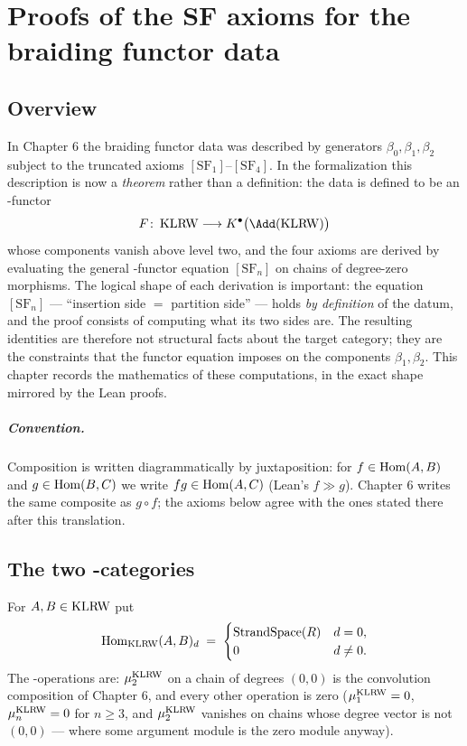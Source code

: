 \chapter{Proofs of the SF axioms for the braiding functor data}

\section{Overview}

In Chapter 6 the braiding functor data was described by generators
$\beta_0, \beta_1, \beta_2$ subject to the truncated axioms
$[\mathrm{SF}_1]$--$[\mathrm{SF}_4]$. In the formalization this description is
now a \emph{theorem} rather than a definition: the data is defined to be an
\Ainf-functor
\[
  F \colon \KLRW \longrightarrow K^\bullet\big(\Add(\KLRW)\big)
\]
whose components vanish above level two, and the four axioms are derived by
evaluating the general \Ainf-functor equation $[\mathrm{SF}_n]$ on chains of
degree-zero morphisms. The logical shape of each derivation is important: the
equation $[\mathrm{SF}_n]$ --- ``insertion side $=$ partition side'' --- holds
\emph{by definition} of the datum, and the proof consists of computing what
its two sides are. The resulting identities are therefore not structural
facts about the target category; they are the constraints that the functor
equation imposes on the components $\beta_1, \beta_2$. This chapter records
the mathematics of these computations, in the exact shape mirrored by the
Lean proofs.

\paragraph{Convention.} Composition is written diagrammatically by
juxtaposition: for $f \in \operatorname{Hom}(A,B)$ and $g \in \operatorname{Hom}(B,C)$ we write
$fg \in \operatorname{Hom}(A,C)$ (Lean's $f \gg g$). Chapter 6 writes the same composite as
$g \circ f$; the axioms below agree with the ones stated there after this
translation.

\section{The two \texorpdfstring{\Ainf}{A-infinity}-categories}

\begin{definition}\label{def:klrw-graded}
  For $A, B \in \operatorname{KLRW}$ put
  \[
    \operatorname{Hom}_{\operatorname{KLRW}}(A,B)_d \;=\;
    \begin{cases}
      \text{StrandSpace}(R) & d = 0,\\
      0 & d \neq 0.
    \end{cases}
  \]
  The \Ainf-operations are: $\mu^{\operatorname{KLRW}}_2$ on a chain of degrees $(0,0)$ is
  the convolution composition of Chapter 6, and every other operation is zero
  ($\mu^{\operatorname{KLRW}}_1 = 0$, $\mu^{\operatorname{KLRW}}_n = 0$ for $n \geq 3$, and $\mu^{\operatorname{KLRW}}_2$
  vanishes on chains whose degree vector is not $(0,0)$ --- where some argument
  module is the zero module anyway).
\end{definition}

